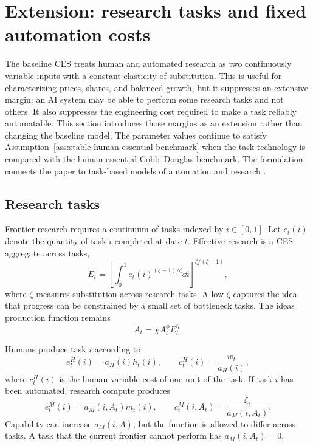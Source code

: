 \section{Extension: research tasks and fixed automation costs}
\label{sec:task-extension}

The baseline CES treats human and automated research as two continuously variable
inputs with a constant elasticity of substitution. This is useful for characterizing
prices, shares, and balanced growth, but it suppresses an extensive margin: an AI
system may be able to perform some research tasks and not others. It also suppresses
the engineering cost required to make a task reliably automatable. This section
introduces those margins as an extension rather than changing the baseline model.
The parameter values continue to satisfy
Assumption~\ref{ass:stable-human-essential-benchmark} when the task technology is
compared with the human-essential Cobb--Douglas benchmark.
The formulation connects the paper to task-based models of automation and research
\citep{aghionjonesjones2019,acemoglu2025,jones2025rd}.

\subsection{Research tasks}

Frontier research requires a continuum of tasks indexed by $i\in[0,1]$. Let
$e_t(i)$ denote the quantity of task $i$ completed at date $t$. Effective research
is a CES aggregate across tasks,
\begin{equation}
    E_t
    =
    \left[
        \int_0^1 e_t(i)^{(\zeta-1)/\zeta}\dd i
    \right]^{\zeta/(\zeta-1)},
    \label{eq:task-research-aggregator}
\end{equation}
where $\zeta$ measures substitution across research tasks. A low $\zeta$ captures
the idea that progress can be constrained by a small set of bottleneck tasks. The
ideas production function remains
\begin{equation}
    \dot A_t=\chi A_t^\phi E_t^\eta.
    \label{eq:task-ideas-production}
\end{equation}

Humans produce task $i$ according to
\begin{equation}
    e^H_t(i)=a_H(i)h_t(i),
    \qquad
    c^H_t(i)=\frac{w_t}{a_H(i)},
    \label{eq:human-task-cost}
\end{equation}
where $c^H_t(i)$ is the human variable cost of one unit of the task. If task $i$
has been automated, research compute produces
\begin{equation}
    e^M_t(i)=a_M(i,A_t)m_t(i),
    \qquad
    c^M_t(i,A_t)=\frac{\xi_t}{a_M(i,A_t)}.
    \label{eq:machine-task-cost}
\end{equation}
Capability can increase $a_M(i,A)$, but the function is allowed to differ across
tasks. A task that the current frontier cannot perform has $a_M(i,A_t)=0$.

